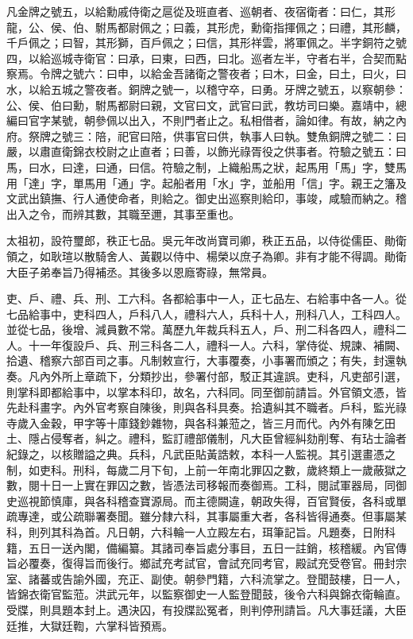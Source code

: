 凡金牌之號五，以給勳戚侍衛之扈從及班直者、巡朝者、夜宿衛者：曰仁，其形龍，公、侯、伯、駙馬都尉佩之；曰義，其形虎，勳衛指揮佩之；曰禮，其形麟，千戶佩之；曰智，其形獅，百戶佩之；曰信，其形祥雲，將軍佩之。半字銅符之號四，以給巡城寺衛官：曰承，曰東，曰西，曰北。巡者左半，守者右半，合契而點察焉。令牌之號六：曰申，以給金吾諸衛之警夜者；曰木，曰金，曰土，曰火，曰水，以給五城之警夜者。銅牌之號一，以稽守卒，曰勇。牙牌之號五，以察朝參：公、侯、伯曰勳，駙馬都尉曰親，文官曰文，武官曰武，教坊司曰樂。嘉靖中，總編曰官字某號，朝參佩以出入，不則門者止之。私相借者，論如律。有故，納之內府。祭牌之號三：陪，祀官曰陪，供事官曰供，執事人曰執。雙魚銅牌之號二：曰嚴，以肅直衛錦衣校尉之止直者；曰善，以飾光祿胥役之供事者。符驗之號五：曰馬，曰水，曰達，曰通，曰信。符驗之制，上織船馬之狀，起馬用「馬」字，雙馬用「達」字，單馬用「通」字。起船者用「水」字，並船用「信」字。親王之籓及文武出鎮撫、行人通使命者，則給之。御史出巡察則給印，事竣，咸驗而納之。稽出入之令，而辨其數，其職至邇，其事至重也。

太祖初，設符璽郎，秩正七品。吳元年改尚寶司卿，秩正五品，以侍從儒臣、勛衛領之，如耿瑄以散騎舍人、黃觀以侍中、楊榮以庶子為卿。非有才能不得調。勛衛大臣子弟奉旨乃得補丞。其後多以恩廕寄祿，無常員。

吏、戶、禮、兵、刑、工六科。各都給事中一人，正七品左、右給事中各一人。從七品給事中，吏科四人，戶科八人，禮科六人，兵科十人，刑科八人，工科四人。並從七品，後增、減員數不常。萬歷九年裁兵科五人，戶、刑二科各四人，禮科二人。十一年復設戶、兵、刑三科各二人，禮科一人。六科，掌侍從、規諫、補闕、拾遺、稽察六部百司之事。凡制敕宣行，大事覆奏，小事署而頒之；有失，封還執奏。凡內外所上章疏下，分類抄出，參署付部，駁正其違誤。吏科，凡吏部引選，則掌科即都給事中，以掌本科印，故名，六科同。同至御前請旨。外官領文憑，皆先赴科畫字。內外官考察自陳後，則與各科具奏。拾遺糾其不職者。戶科，監光祿寺歲入金穀，甲字等十庫錢鈔雜物，與各科兼蒞之，皆三月而代。內外有陳乞田土、隱占侵奪者，糾之。禮科，監訂禮部儀制，凡大臣曾經糾劾削奪、有玷士論者紀錄之，以核贈謚之典。兵科，凡武臣貼黃誥敕，本科一人監視。其引選畫憑之制，如吏科。刑科，每歲二月下旬，上前一年南北罪囚之數，歲終類上一歲蔽獄之數，閱十日一上實在罪囚之數，皆憑法司移報而奏御焉。工科，閱試軍器局，同御史巡視節慎庫，與各科稽查寶源局。而主德闕違，朝政失得，百官賢佞，各科或單疏專達，或公疏聯署奏聞。雖分隸六科，其事屬重大者，各科皆得通奏。但事屬某科，則列其科為首。凡日朝，六科輪一人立殿左右，珥筆記旨。凡題奏，日附科籍，五日一送內閣，備編纂。其諸司奉旨處分事目，五日一註銷，核稽緩。內官傳旨必覆奏，復得旨而後行。鄉試充考試官，會試充同考官，殿試充受卷官。冊封宗室、諸蕃或告諭外國，充正、副使。朝參門籍，六科流掌之。登聞鼓樓，日一人，皆錦衣衛官監蒞。洪武元年，以監察御史一人監登聞鼓，後令六科與錦衣衛輪直。受牒，則具題本封上。遇決囚，有投牒訟冤者，則判停刑請旨。凡大事廷議，大臣廷推，大獄廷鞫，六掌科皆預焉。

